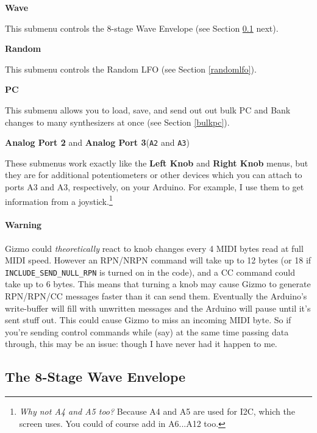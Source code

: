 \documentclass{article}
\begin{document}
\begin{description}
	\item{\bf Wave}
	
	This submenu controls the 8-stage Wave Envelope (see Section \ref{waveenvelope} next).

	\item{\bf Random}
	
	This submenu controls the Random LFO (see Section \ref{randomlfo}).
	
	\item{\bf PC}
	
	This submenu allows you to load, save, and send out out bulk PC and Bank changes to many synthesizers at once (see Section \ref{bulkpc}).

	\item{\bf Analog Port 2} and {\bf Analog Port 3}\quad (\texttt{A2} and \texttt{A3})
	
	These submenus work exactly like the {\bf Left Knob} and {\bf Right Knob} menus, but they are for additional potentiometers or other devices which you can attach to ports A3 and A3, respectively, on your Arduino.  For example, I use them to get information from a joystick.\footnote{{\it Why not A4 and A5 too?\quad} Because A4 and A5 are used for I2C, which the screen uses.  You could of course add in A6...A12 too.}
	
	\end{description}
	
\paragraph{Warning} Gizmo could {\it theoretically} react to knob changes every 4 MIDI bytes read at full MIDI speed.  However an RPN/NRPN command will take up to 12 bytes (or 18 if \texttt{INCLUDE\_SEND\_NULL\_RPN} is turned on in the code), and a CC command could take up to 6 bytes.  This means that turning a knob may cause Gizmo to generate RPN/RPN/CC messages faster than it can send them.  Eventually the Arduino's write-buffer will fill with unwritten messages and the Arduino will pause until it's sent stuff out.  This could cause Gizmo to miss an incoming MIDI byte.  So if you're sending control commands while (say) at the same time passing data through, this may be an issue: though I have never had it happen to me.

\subsection{The 8-Stage Wave Envelope}
\label{waveenvelope}
\end{document}
